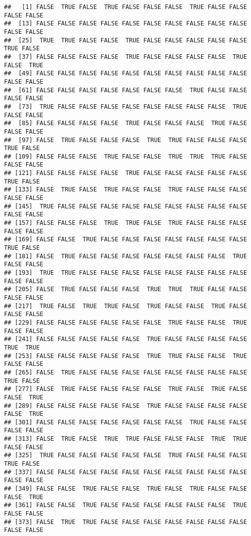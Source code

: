 \documentclass[
]{book}
\begin{document}
\begin{verbatim}
##   [1] FALSE  TRUE FALSE  TRUE FALSE FALSE FALSE  TRUE FALSE FALSE FALSE FALSE
##  [13] FALSE FALSE FALSE FALSE FALSE FALSE FALSE FALSE FALSE FALSE FALSE FALSE
##  [25]  TRUE  TRUE FALSE FALSE  TRUE FALSE FALSE FALSE FALSE FALSE  TRUE FALSE
##  [37] FALSE FALSE FALSE FALSE  TRUE FALSE FALSE FALSE FALSE  TRUE FALSE  TRUE
##  [49] FALSE FALSE FALSE FALSE FALSE FALSE FALSE FALSE FALSE FALSE FALSE FALSE
##  [61] FALSE FALSE FALSE FALSE FALSE FALSE FALSE  TRUE FALSE FALSE FALSE FALSE
##  [73]  TRUE FALSE FALSE FALSE FALSE FALSE FALSE FALSE FALSE  TRUE FALSE FALSE
##  [85] FALSE FALSE FALSE FALSE  TRUE FALSE FALSE FALSE  TRUE FALSE FALSE FALSE
##  [97] FALSE  TRUE FALSE FALSE FALSE  TRUE  TRUE FALSE FALSE FALSE  TRUE FALSE
## [109] FALSE FALSE FALSE  TRUE FALSE FALSE  TRUE  TRUE  TRUE FALSE FALSE FALSE
## [121] FALSE FALSE FALSE FALSE  TRUE FALSE FALSE FALSE FALSE FALSE  TRUE FALSE
## [133] FALSE  TRUE FALSE  TRUE FALSE FALSE  TRUE FALSE FALSE FALSE FALSE FALSE
## [145]  TRUE FALSE FALSE FALSE FALSE FALSE FALSE FALSE FALSE FALSE FALSE FALSE
## [157] FALSE FALSE FALSE  TRUE  TRUE FALSE  TRUE FALSE FALSE FALSE FALSE FALSE
## [169] FALSE FALSE  TRUE FALSE FALSE FALSE FALSE FALSE FALSE FALSE  TRUE FALSE
## [181] FALSE  TRUE FALSE FALSE FALSE FALSE FALSE FALSE FALSE  TRUE FALSE FALSE
## [193]  TRUE  TRUE FALSE FALSE FALSE FALSE FALSE FALSE FALSE FALSE FALSE FALSE
## [205] FALSE  TRUE FALSE FALSE FALSE  TRUE  TRUE  TRUE FALSE FALSE FALSE FALSE
## [217]  TRUE FALSE  TRUE  TRUE FALSE  TRUE FALSE FALSE  TRUE FALSE FALSE FALSE
## [229] FALSE FALSE FALSE FALSE FALSE FALSE  TRUE FALSE FALSE  TRUE FALSE FALSE
## [241] FALSE FALSE FALSE FALSE FALSE  TRUE FALSE FALSE FALSE FALSE  TRUE  TRUE
## [253] FALSE FALSE FALSE FALSE FALSE  TRUE  TRUE FALSE FALSE  TRUE FALSE FALSE
## [265] FALSE  TRUE FALSE FALSE FALSE FALSE FALSE FALSE FALSE FALSE  TRUE FALSE
## [277] FALSE  TRUE FALSE FALSE FALSE FALSE  TRUE FALSE  TRUE FALSE FALSE  TRUE
## [289] FALSE FALSE FALSE FALSE FALSE  TRUE FALSE FALSE FALSE FALSE FALSE  TRUE
## [301] FALSE FALSE FALSE FALSE FALSE FALSE FALSE  TRUE FALSE FALSE FALSE FALSE
## [313] FALSE  TRUE FALSE  TRUE  TRUE FALSE FALSE FALSE  TRUE  TRUE FALSE FALSE
## [325]  TRUE FALSE FALSE FALSE FALSE FALSE  TRUE FALSE FALSE FALSE  TRUE FALSE
## [337] FALSE FALSE FALSE FALSE FALSE FALSE FALSE FALSE FALSE FALSE FALSE FALSE
## [349] FALSE FALSE  TRUE FALSE FALSE  TRUE FALSE  TRUE FALSE FALSE FALSE  TRUE
## [361] FALSE FALSE  TRUE FALSE FALSE FALSE FALSE FALSE FALSE  TRUE FALSE FALSE
## [373] FALSE  TRUE  TRUE FALSE FALSE FALSE FALSE FALSE FALSE FALSE FALSE FALSE

\end{verbatim}
\end{document}
